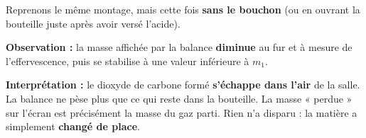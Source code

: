 \documentclass[11pt]{article}
\begin{document}
\begin{experience}
Reprenons le même montage, mais cette fois \textbf{sans le bouchon} (ou en ouvrant la bouteille juste après avoir versé l'acide).

\textbf{Observation :} la masse affichée par la balance \textbf{diminue} au fur et à mesure de l'effervescence, puis se stabilise à une valeur inférieure à $m_1$.

\textbf{Interprétation :} le dioxyde de carbone  formé \textbf{s'échappe dans l'air} de la salle. La balance ne pèse plus que ce qui reste dans la bouteille. La masse « perdue » sur l'écran est précisément la masse du gaz parti. Rien n'a disparu : la matière a simplement \textbf{changé de place}.
\end{experience}
\end{document}
